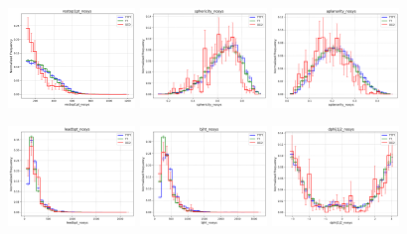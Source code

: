 \documentclass[twoside]{article}
\begin{document}
\begin{figure}[H]
    \centering
    \includegraphics[width=0.3\textwidth]{plots/evtbdt/input_vars/restop1pt_nosys.png}
    \hfill
    \includegraphics[width=0.3\textwidth]{plots/evtbdt/input_vars/sphericity_nosys.png}
    \hfill
    \includegraphics[width=0.3\textwidth]{plots/evtbdt/input_vars/aplanarity_nosys.png}
\end{figure}

\begin{figure}[H]
    \centering
    \includegraphics[width=0.3\textwidth]{plots/evtbdt/input_vars/leadbpt_nosys.png}
    \hfill
    \includegraphics[width=0.3\textwidth]{plots/evtbdt/input_vars/bjht_nosys.png}
    \hfill
    \includegraphics[width=0.3\textwidth]{plots/evtbdt/input_vars/dphij1j2_nosys.png}
\end{figure}
\end{document}
